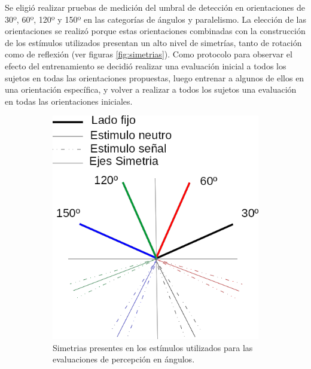 \documentclass{article}
\numberwithin{figure}{section}
\begin{document}
    Se eligió realizar pruebas de medición del umbral de detección en orientaciones de 30º, 60º, 120º y 150º en las categorías de ángulos y paralelismo. La elección de las orientaciones se realizó porque estas orientaciones combinadas con la construcción de los estímulos utilizados presentan un alto nivel de simetrías, tanto de rotación como de reflexión (ver figuras \ref{fig:simetrias}). Como protocolo para observar el efecto del entrenamiento se decidió realizar una evaluación inicial a todos los sujetos en todas las orientaciones propuestas, luego entrenar a algunos de ellos en una orientación específica, y volver a realizar a todos los sujetos una evaluación en todas las orientaciones iniciales. 
    
    \begin{figure}
        \begin{subfigure}{.47\textwidth}
            \centering
            \includegraphics[width=\textwidth]{Imagenes/SimetriasOrientacionAngulos.png}
            \caption{Simetrias presentes en los estímulos utilizados para las evaluaciones de percepción en ángulos.}
        \end{subfigure}
        \begin{subfigure}{.53\textwidth}
            \centering

\end{subfigure}
\end{figure}
\end{document}
